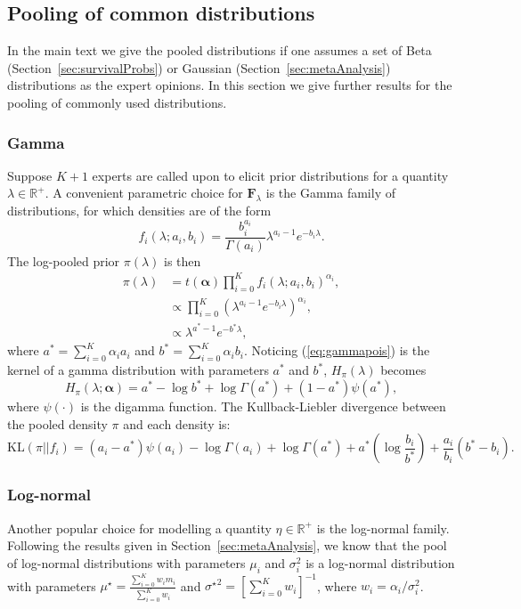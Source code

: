 \documentclass[a4paper, notitlepage, 10pt]{article}
\begin{document}
\newpage
\subsection{Pooling of common distributions}
\label{sec:common_poolings}

In the main text we give the pooled distributions if one assumes a set of Beta (Section~\ref{sec:survivalProbs}) or Gaussian (Section~\ref{sec:metaAnalysis}) distributions as the expert opinions.
In this section we give further results for the pooling of commonly used distributions.

\subsubsection{Gamma}
\label{sec:gamma}
Suppose $K + 1$ experts are called upon to elicit prior distributions for a quantity $\lambda \in \mathbb{R}^+$.
A convenient parametric choice for $\mathbf{F}_\lambda$ is the Gamma family of distributions, for which densities are of the form
$$ f_i(\lambda;a_i,b_i) = \frac{b_i^{a_i}}{\Gamma(a_i)} \lambda^{a_i-1} e^{-b_i\lambda}.$$
The log-pooled prior $\pi(\lambda)$ is then
\begin{align}
\nonumber
\pi(\lambda)&= t(\boldsymbol\alpha)\prod_{i=0}^{K}f_i(\lambda;a_i,b_i)^{\alpha_i},\\
\nonumber
&\propto \prod_{i=0}^{K} \left(\lambda^{a_i-1} e^{-b_i\lambda}\right)^{\alpha_i},\\
\label{eq:gammapois}
&\propto \lambda^{a^*-1} e^{-b^*\lambda},
\end{align}
where $a^* =\sum_{i=0}^{K}\alpha_ia_i$ and $b^* = \sum_{i=0}^{K}\alpha_ib_i$.
Noticing (\ref{eq:gammapois}) is the kernel of a gamma distribution with parameters $a^*$ and $b^*$, $H_{\pi}(\lambda)$ becomes
\begin{equation}
\label{eq:entropygamma}
H_{\pi}(\lambda; \boldsymbol\alpha) = a^* - \log b^* + \log \Gamma(a^*) + (1-a^*)\psi(a^*),
\end{equation}
where $\psi(\cdot)$ is the digamma function.
The Kullback-Liebler divergence between the pooled density $\pi$ and each density is:
\begin{equation}
 \label{eq:KLgamma}
 \text{KL}(\pi || f_i) = (a_i-a^*)\psi(a_i) - \log\Gamma(a_i) + \log\Gamma(a^*) + a^*\left(\log\frac{b_i}{b^*}\right) + \frac{a_i}{b_i}(b^*-b_i).
\end{equation}

\subsubsection{Log-normal} 
\label{sec:log-normal}
Another popular choice for modelling a quantity $\eta \in \mathbb{R}^+$ is the log-normal family.
Following the results given in Section~\ref{sec:metaAnalysis}, we know that the pool of log-normal distributions with parameters $\mu_i$ and $\sigma_i^2$ is a log-normal distribution with parameters $\mu^\star = \frac{\sum_{i=0}^K w_im_i}{\sum_{i=0}^K w_i}$ and ${\sigma^\star}^2 = [\sum_{i=0}^K w_i]^{-1}$,  where $w_i = \alpha_i/\sigma_i^2$.
\end{document}
